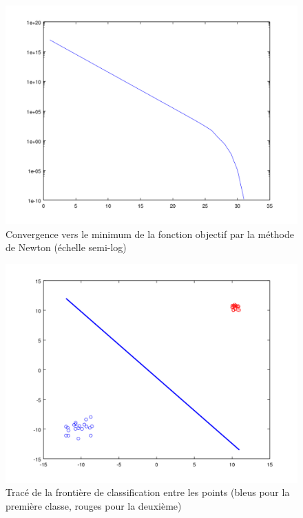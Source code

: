 \documentclass{article}
\begin{document}
         \begin{figure}
           \begin{center}
             \subfigure\includegraphics[scale=0.3]{images/cvnewton2.png}
             \caption{Convergence vers le minimum de la fonction objectif par la méthode de Newton (échelle semi-log)}
           \end{center}
         \end{figure}

         \begin{figure}
           \begin{center}
             \subfigure\includegraphics[scale=0.3]{images/line2D2.png}
             \caption{Tracé de la frontière de classification entre les points (bleus pour la première classe, rouges pour la deuxième)}
           \end{center}
         \end{figure}
\end{document}
